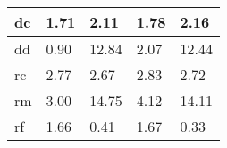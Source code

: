 \begin{tabular}{|l|l|l|l|l|}
\hline
dc &1.71& 2.11&1.78& 2.16\\\hline
dd &0.90&12.84&2.07&12.44\\\hline
rc &2.77& 2.67&2.83& 2.72\\\hline
rm &3.00&14.75&4.12&14.11\\\hline
rf &1.66& 0.41&1.67& 0.33\\\hline
\end{tabular}
